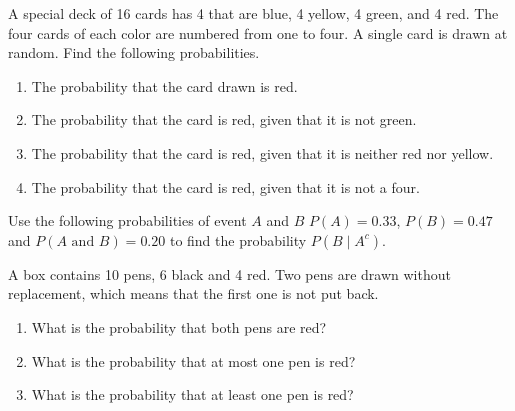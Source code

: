 \begin{exercise}

A special deck of 16 cards has 4 that are blue, 4 yellow, 4 green, and 4
red. The four cards of each color are numbered from one to four. A
single card is drawn at random. Find the following probabilities.

\begin{enumerate}
\item
  The probability that the card drawn is red.
\item
  The probability that the card is red, given that it is not green.
\item
  The probability that the card is red, given that it is neither red nor
  yellow.
\item
  The probability that the card is red, given that it is not a four.
\end{enumerate}

\end{exercise}

\begin{exercise}

  Use the following probabilities of event $A$ and $B$  
  $P(A)=0.33$, $P(B)=0.47$ and $P(A\text{~and~}B)=0.20$
  to find the probability $P(B\mid A^c)$.

\end{exercise}
\vspace*{6\baselineskip}

\begin{exercise}

A box contains 10 pens, 6 black and 4 red. Two pens are drawn without
replacement, which means that the first one is not put back.

\begin{enumerate}
\item
  What is the probability that both pens are red?
\item
  What is the probability that at most one pen is red?
\item
  What is the probability that at least one pen is red?
\end{enumerate}

\end{exercise}

